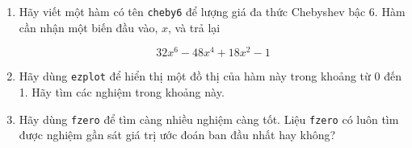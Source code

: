 \documentclass[12pt]{book}
\begin{document}
\begin{ex}

\begin{enumerate}

\item Hãy viết một hàm có tên {\tt cheby6} để lượng giá đa thức
Chebyshev bậc 6. Hàm cần nhận một biến đầu vào, $x$, và trả lại

\begin{equation}
32 x^6 - 48 x^4 + 18 x^2 - 1
\end{equation}

\item Hãy dùng {\tt ezplot} để hiển thị một đồ thị của hàm này trong
khoảng từ 0 đến 1. Hãy tìm các nghiệm trong khoảng này.

\item Hãy dùng {\tt fzero} để tìm càng nhiều nghiệm càng tốt. Liệu
{\tt fzero} có luôn tìm được nghiệm gần sát giá trị ước đoán ban đầu
nhất hay không?

\end{enumerate}
\end{ex}
\end{document}
